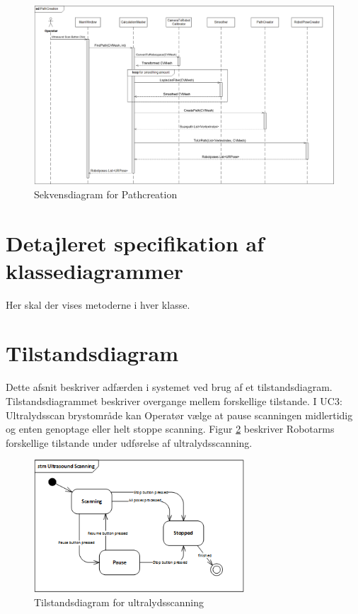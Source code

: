 \begin{figure}[H]
    \centering
    \includegraphics[width=1.4\textwidth, angle =90]{figurer/d/Design/Sequence/sd_ultrascan}
    \caption{Sekvensdiagram for Pathcreation}
    \label{sd_ultrascan}
\end{figure}
\newpage

\section{Detajleret specifikation af klassediagrammer}
Her skal der vises metoderne i hver klasse. 

\section{Tilstandsdiagram}
Dette afsnit beskriver adfærden i systemet ved brug af et tilstandsdiagram. Tilstandsdiagrammet beskriver overgange mellem forskellige tilstande. I UC3: Ultralydsscan brystområde kan Operatør vælge at pause scanningen midlertidig og enten genoptage eller helt stoppe scanning. Figur \ref{stm_Ultra} beskriver Robotarms forskellige tilstande under udførelse af ultralydsscanning. 

\begin{figure}[H]
    \centering
    \includegraphics[width=0.7\textwidth]{figurer/d/Design/stm_UC3}
    \caption{Tilstandsdiagram for ultralydsscanning}
    \label{stm_Ultra}
\end{figure}

